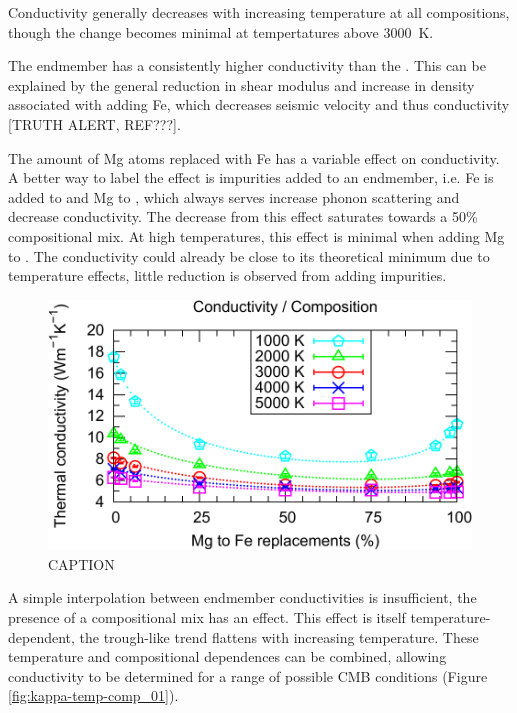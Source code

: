 Conductivity generally decreases with increasing temperature at all compositions, though the change becomes minimal at tempertatures above 3000~K.

The \mgsios endmember has a consistently higher conductivity than the \fesio. This can be explained by the general reduction in shear modulus and increase in density associated with adding Fe, which decreases seismic velocity and thus conductivity [TRUTH ALERT, REF???].

The amount of Mg atoms replaced with Fe has a variable effect on conductivity. A better way to label the effect is impurities added to an endmember, i.e. Fe is added to \mgsios and Mg to \fesio, which always serves increase phonon scattering and decrease conductivity. The decrease from this effect saturates towards a 50\% compositional mix. At high temperatures, this effect is minimal when adding Mg to \fesio. The conductivity could already be close to its theoretical minimum due to temperature effects, little reduction is observed from adding impurities.

\begin{figure}[h!]
  \includegraphics[width=\linewidth]{Figures/k-c_all_01.png}
  \caption{CAPTION}
  \label{fig:kappa-comp_01}
\end{figure}

A simple interpolation between endmember conductivities is insufficient, the presence of a compositional mix has an effect. This effect is itself temperature-dependent, the trough-like trend flattens with increasing temperature. These temperature and compositional dependences can be combined, allowing conductivity to be determined for a range of possible CMB conditions (Figure \ref{fig:kappa-temp-comp_01}). 

